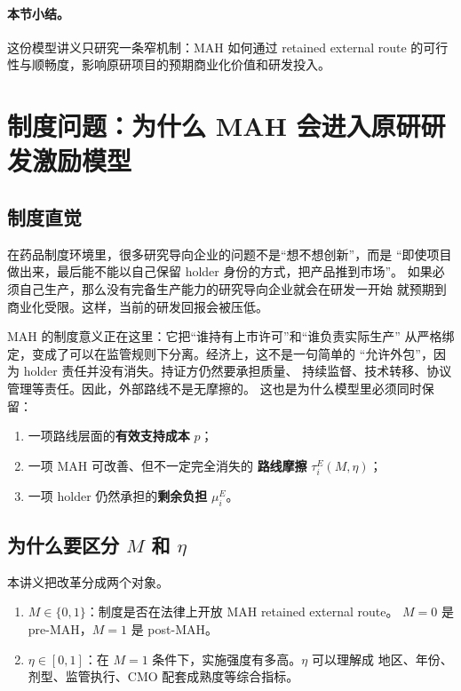 \documentclass[12pt,UTF8]{ctexart}
\theoremstyle{plain}
\theoremstyle{remark}
\begin{document}
\paragraph{本节小结。}
这份模型讲义只研究一条窄机制：MAH 如何通过 retained external route
的可行性与顺畅度，影响原研项目的预期商业化价值和研发投入。

\section{制度问题：为什么 MAH 会进入原研研发激励模型}

\subsection{制度直觉}

在药品制度环境里，很多研究导向企业的问题不是“想不想创新”，而是
“即使项目做出来，最后能不能以自己保留 holder 身份的方式，把产品推到市场”。
如果必须自己生产，那么没有完备生产能力的研究导向企业就会在研发一开始
就预期到商业化受限。这样，当前的研发回报会被压低。

MAH 的制度意义正在这里：它把“谁持有上市许可”和“谁负责实际生产”
从严格绑定，变成了可以在监管规则下分离。经济上，这不是一句简单的
“允许外包”，因为 holder 责任并没有消失。持证方仍然要承担质量、
持续监督、技术转移、协议管理等责任。因此，外部路线不是无摩擦的。
这也是为什么模型里必须同时保留：

\begin{enumerate}[leftmargin=2em]
    \item 一项路线层面的\textbf{有效支持成本} $p$；
    \item 一项 MAH 可改善、但不一定完全消失的
    \textbf{路线摩擦} $\tau_i^E(M,\eta)$；
    \item 一项 holder 仍然承担的\textbf{剩余负担} $\mu_i^E$。
\end{enumerate}

\subsection{为什么要区分 \texorpdfstring{$M$ 和 $\eta$}{M 和 eta}}

本讲义把改革分成两个对象。

\begin{enumerate}[leftmargin=2em]
    \item $M\in\{0,1\}$：制度是否在法律上开放 MAH retained external route。
    $M=0$ 是 pre-MAH，$M=1$ 是 post-MAH。
    \item $\eta\in[0,1]$：在 $M=1$ 条件下，实施强度有多高。$\eta$ 可以理解成
    地区、年份、剂型、监管执行、CMO 配套成熟度等综合指标。
\end{enumerate}
\end{document}

